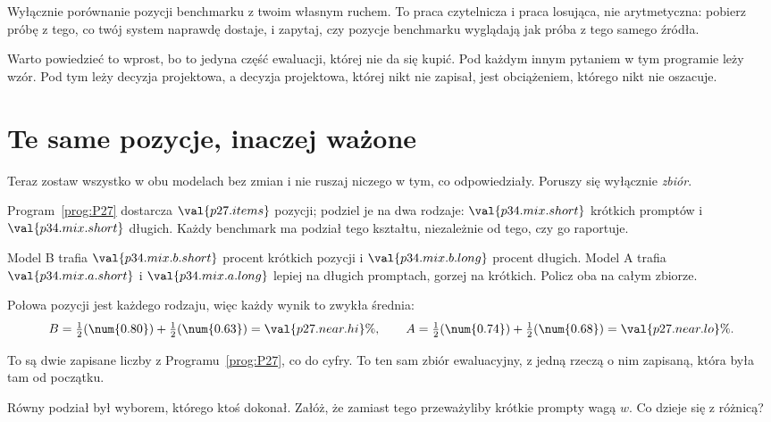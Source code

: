 \begin{fr}
\begin{ansblock}
Wyłącznie porównanie pozycji benchmarku z twoim własnym ruchem. To praca
czytelnicza i praca losująca, nie arytmetyczna: pobierz próbę z tego, co
twój system naprawdę dostaje, i zapytaj, czy pozycje benchmarku wyglądają
jak próba z tego samego źródła.
\end{ansblock}

Warto powiedzieć to wprost, bo to jedyna część ewaluacji, której nie da się
kupić. Pod każdym innym pytaniem w tym programie leży wzór. Pod tym leży
decyzja projektowa, a decyzja projektowa, której nikt nie zapisał, jest
obciążeniem, którego nikt nie oszacuje.

\end{fr}

\section{Te same pozycje, inaczej ważone}
\label{sec:P34-remix}

\begin{fr}
Teraz zostaw wszystko w obu modelach bez zmian i nie ruszaj niczego w tym, co
odpowiedziały. Poruszy się wyłącznie \emph{zbiór}.

Program~\ref{prog:P27} dostarcza $\val{p27.items}$ pozycji; podziel je na dwa
rodzaje: $\val{p34.mix.short}$ krótkich promptów i $\val{p34.mix.short}$
długich. Każdy benchmark ma podział tego kształtu, niezależnie od tego, czy
go raportuje.

Model B trafia $\val{p34.mix.b.short}$ procent krótkich pozycji i
$\val{p34.mix.b.long}$ procent długich. Model A trafia
$\val{p34.mix.a.short}$ i $\val{p34.mix.a.long}$ \dash{} lepiej na długich
promptach, gorzej na krótkich. Policz oba na całym zbiorze.
\dotline
\nextframe
\end{fr}

\begin{fr}
\begin{ansblock}
Połowa pozycji jest każdego rodzaju, więc każdy wynik to zwykła średnia:
\[ B = \tfrac{1}{2}(\num{0.80}) + \tfrac{1}{2}(\num{0.63}) = \val{p27.near.hi}\%,
   \qquad
   A = \tfrac{1}{2}(\num{0.74}) + \tfrac{1}{2}(\num{0.68}) = \val{p27.near.lo}\% . \]
\end{ansblock}

To są dwie zapisane liczby z Programu~\ref{prog:P27}, co do cyfry. To ten sam
zbiór ewaluacyjny, z jedną rzeczą o nim zapisaną, która była tam od początku.

Równy podział był wyborem, którego ktoś dokonał. Załóż, że zamiast tego
przeważyliby krótkie prompty wagą $w$. Co dzieje się z różnicą?
\dotline
\nextframe
\end{fr}


